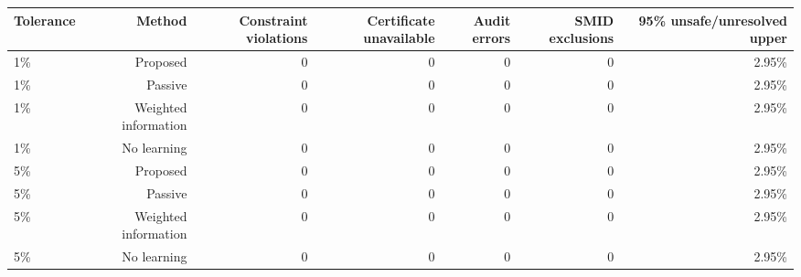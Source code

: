 \begin{tabular}{lrrrrrr}
\toprule
Tolerance & Method & Constraint violations & Certificate unavailable & Audit errors & SMID exclusions & 95\% unsafe/unresolved upper \\
\midrule
1\% & Proposed & 0 & 0 & 0 & 0 & 2.95\% \\
1\% & Passive & 0 & 0 & 0 & 0 & 2.95\% \\
1\% & Weighted information & 0 & 0 & 0 & 0 & 2.95\% \\
1\% & No learning & 0 & 0 & 0 & 0 & 2.95\% \\
5\% & Proposed & 0 & 0 & 0 & 0 & 2.95\% \\
5\% & Passive & 0 & 0 & 0 & 0 & 2.95\% \\
5\% & Weighted information & 0 & 0 & 0 & 0 & 2.95\% \\
5\% & No learning & 0 & 0 & 0 & 0 & 2.95\% \\
\bottomrule
\end{tabular}
